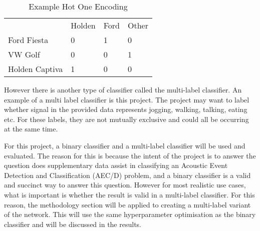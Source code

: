 \documentclass{UoNMCHA}
\numberwithin{equation}{section}
\begin{document}
\begin{table}[h]
    \begin{center}  
    \caption{Example Hot One Encoding}\label{tab:HotOneEnc}
        \begin{tabular}{llll}
                           & Holden & Ford & Other \\
            Ford Fiesta    & 0      & 1    & 0     \\
            VW Golf        & 0      & 0    & 1     \\
            Holden Captiva & 1      & 0    & 0    
        \end{tabular}
    \end{center}
\end{table}

However there is another type of classifier called the multi-label classifier. An example of a multi label classifier is this project. The project may want to label whether signal in the provided data represents jogging, walking, talking, eating etc. For these labels, they are not mutually exclusive and could all be occurring at the same time.

For this project, a binary classifier and a multi-label classifier will be used and evaluated. The reason for this is because the intent of the project is to answer the question does supplementary data assist in classifying an Acoustic Event Detection and Classification (AEC/D) problem, and a binary classifier is a valid and succinct way to answer this question. However for most realistic use cases, what is important is whether the result is valid in a multi-label classifier. For this reason, the methodology section will be applied to creating a multi-label variant of the network. This will use the same hyperparameter optimisation as the binary classifier and will be discussed in the results. 


\end{document}
